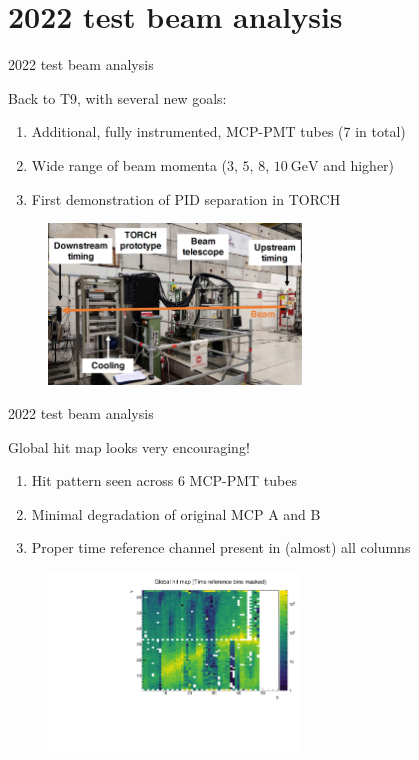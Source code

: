 \documentclass[xcolor={dvipsnames}]{beamer}
\begin{document}
\section{2022 test beam analysis}
\begin{frame}{2022 test beam analysis}
  \vspace{0.0cm}
  \begin{center}
    {\large Back to T9, with several new goals:}
  \end{center}
  \begin{enumerate}
    \setlength\itemsep{1.0em}
    \item{Additional, fully instrumented, MCP-PMT tubes (7 in total)}
    \item{Wide range of beam momenta ($3$, $5$, $8$, $\SI{10}{\giga\eV}$ and higher)}
    \item{First demonstration of PID separation in TORCH}
  \end{enumerate}
  \begin{figure}
    \centering
    \includegraphics[width = 0.6\textwidth]{Figs/TORCH_overview.png}
  \end{figure}
\end{frame}

\begin{frame}{2022 test beam analysis}
  \vspace{0.0cm}
  \begin{center}
    {\large Global hit map looks very encouraging!}
  \end{center}
  \begin{enumerate}
    \setlength\itemsep{1.0em}
    \item{Hit pattern seen across 6 MCP-PMT tubes}
    \item{Minimal degradation of original MCP A and B}
    \item{Proper time reference channel present in (almost) all columns}
  \end{enumerate}
  \begin{figure}
    \centering
    \includegraphics[width = 0.6\textwidth]{Figs/GlobalHitMap_Run480.pdf}
  \end{figure}
\end{frame}
\end{document}
